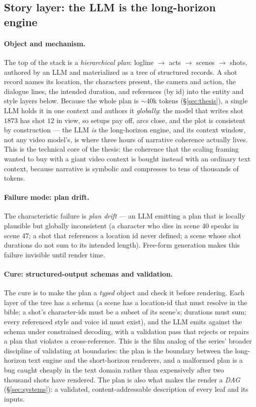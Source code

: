 \documentclass[11pt]{article}
\begin{document}
\subsection{Story layer: the LLM is the long-horizon engine}
\label{sec:story}

\paragraph{Object and mechanism.} The top of the stack is a \emph{hierarchical plan}: logline $\rightarrow$ acts
$\rightarrow$ scenes $\rightarrow$ shots, authored by an LLM and materialized as a tree of structured records. A
shot record names its location, the characters present, the camera and action, the dialogue lines, the intended
duration, and references (by id) into the entity and style layers below. Because the whole plan is $\sim$40k
tokens (\S\ref{sec:thesis}), a single LLM holds it in one context and authors it \emph{globally}: the model that
writes shot $1873$ has shot $12$ in view, so setups pay off, arcs close, and the plot is consistent by
construction --- the LLM \emph{is} the long-horizon engine, and its context window, not any video model's, is
where three hours of narrative coherence actually lives. This is the technical core of the thesis: the coherence
that the scaling framing wanted to buy with a giant video context is bought instead with an ordinary text
context, because narrative is symbolic and compresses to tens of thousands of tokens.

\paragraph{Failure mode: plan drift.} The characteristic failure is \emph{plan drift} --- an LLM emitting a plan
that is locally plausible but globally inconsistent (a character who dies in scene 40 speaks in scene 47; a shot
that references a location id never defined; a scene whose shot durations do not sum to its intended length).
Free-form generation makes this failure invisible until render time.

\paragraph{Cure: structured-output schemas and validation.} The cure is to make the plan a \emph{typed} object
and check it before rendering. Each layer of the tree has a schema (a scene has a location-id that must resolve
in the bible; a shot's character-ids must be a subset of its scene's; durations must sum; every referenced style
and voice id must exist), and the LLM emits against the schema under constrained decoding, with a validation pass
that rejects or repairs a plan that violates a cross-reference. This is the film analog of the series' broader
discipline of validating at boundaries: the plan is the boundary between the long-horizon text engine and the
short-horizon renderers, and a malformed plan is a bug caught cheaply in the text domain rather than expensively
after two thousand shots have rendered. The plan is also what makes the render a \emph{DAG} (\S\ref{sec:systems}):
a validated, content-addressable description of every leaf and its inputs.
\end{document}
